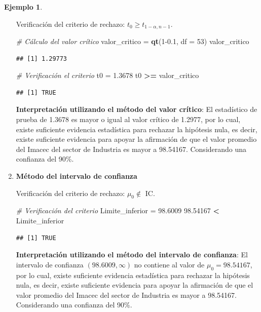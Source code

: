 \documentclass[
  11pt,
]{book}
\newenvironment{Shaded}{\begin{snugshade}}{\end{snugshade}}
\newcommand{\AttributeTok}[1]{\textcolor[rgb]{0.13,0.29,0.53}{#1}}
\newcommand{\CommentTok}[1]{\textcolor[rgb]{0.56,0.35,0.01}{\textit{#1}}}
\newcommand{\DecValTok}[1]{\textcolor[rgb]{0.00,0.00,0.81}{#1}}
\newcommand{\FloatTok}[1]{\textcolor[rgb]{0.00,0.00,0.81}{#1}}
\newcommand{\FunctionTok}[1]{\textcolor[rgb]{0.13,0.29,0.53}{\textbf{#1}}}
\newcommand{\NormalTok}[1]{#1}
\newcommand{\OtherTok}[1]{\textcolor[rgb]{0.56,0.35,0.01}{#1}}
\newcommand{\SpecialCharTok}[1]{\textcolor[rgb]{0.81,0.36,0.00}{\textbf{#1}}}
\theoremstyle{definition}
\theoremstyle{definition}
\newtheorem{example}{Ejemplo}[chapter]
\theoremstyle{definition}
\theoremstyle{definition}
\theoremstyle{remark}
\begin{document}
\begin{example}
\begin{enumerate}
  Verificación del criterio de rechazo: \(t_0 \geq t_{1-\alpha,n-1}\).

\begin{Shaded}
\begin{Highlighting}[]
\CommentTok{\# Cálculo del valor crítico}
\NormalTok{valor\_critico }\OtherTok{=} \FunctionTok{qt}\NormalTok{(}\DecValTok{1}\FloatTok{{-}0.1}\NormalTok{, }\AttributeTok{df =} \DecValTok{53}\NormalTok{)}
\NormalTok{valor\_critico}
\end{Highlighting}
\end{Shaded}

\begin{verbatim}
## [1] 1.29773
\end{verbatim}

\begin{Shaded}
\begin{Highlighting}[]
\CommentTok{\# Verificación el criterio}
\NormalTok{t0 }\OtherTok{=} \FloatTok{1.3678}
\NormalTok{t0 }\SpecialCharTok{\textgreater{}=}\NormalTok{ valor\_critico}
\end{Highlighting}
\end{Shaded}

\begin{verbatim}
## [1] TRUE
\end{verbatim}

  \textbf{Interpretación utilizando el método del valor crítico}: El estadístico de prueba de 1.3678 es mayor o igual al valor crítico de 1.2977, por lo cual, existe suficiente evidencia estadística para rechazar la hipótesis nula, es decir, existe suficiente evidencia para apoyar la afirmación de que el valor promedio del Imacec del sector de Industria es mayor a 98.54167. Considerando una confianza del 90\%.
\item
  \textbf{Método del intervalo de confianza}

  Verificación del criterio de rechazo: \(\mu_0 \notin\) IC.

\begin{Shaded}
\begin{Highlighting}[]
\CommentTok{\# Verificación del criterio}
\NormalTok{Limite\_inferior }\OtherTok{=} \FloatTok{98.6009}
\FloatTok{98.54167} \SpecialCharTok{\textless{}}\NormalTok{ Limite\_inferior}
\end{Highlighting}
\end{Shaded}

\begin{verbatim}
## [1] TRUE
\end{verbatim}

  \textbf{Interpretación utilizando el método del intervalo de confianza}: El intervalo de confianza \((98.6009, \infty)\) no contiene al valor de \(\mu_0 = 98.54167\), por lo cual, existe suficiente evidencia estadística para rechazar la hipótesis nula, es decir, existe suficiente evidencia para apoyar la afirmación de que el valor promedio del Imacec del sector de Industria es mayor a 98.54167. Considerando una confianza del 90\%.
\end{enumerate}

\end{example}
\end{document}
